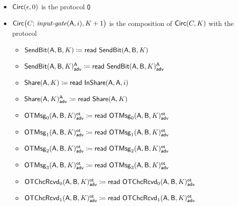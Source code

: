 \begin{itemize}
\item $\Circ(\epsilon,0)$ is the protocol $\zero$

\item $\Circ\big(C; \, \inputgate(\A,i),K+1\big)$ is the composition of $\Circ(C,K)$ with the protocol
\begin{itemize}
\item $\SendBit(\A,\B,K) \coloneqq \read{\SendBit(\A,\B,K)}$
\item {\color{blue} $\LeakSendBit(\A,\B,K)^\A_\adv \coloneqq \read{\LeakSendBit(\A,\B,K)^\A_\adv}$}\smallskip
\item $\Share(\A,K) \coloneqq \read{\InShare(\A,\A,i)}$
\item {\color{blue} $\LeakShare(\A,K)^\A_\adv \coloneqq \read{\Share(\A,K)}$}\smallskip
\item {\color{blue} $\LeakOTMsg_0(\A,\B,K)^\ot_\adv \coloneqq \read{\LeakOTMsg_0(\A,\B,K)^\ot_\adv}$}
\item {\color{blue} $\LeakOTMsg_1(\A,\B,K)^\ot_\adv \coloneqq \read{\LeakOTMsg_1(\A,\B,K)^\ot_\adv}$}
\item {\color{blue} $\LeakOTMsg_2(\A,\B,K)^\ot_\adv \coloneqq \read{\LeakOTMsg_2(\A,\B,K)^\ot_\adv}$}
\item {\color{blue} $\LeakOTMsg_3(\A,\B,K)^\ot_\adv \coloneqq \read{\LeakOTMsg_3(\A,\B,K)^\ot_\adv}$}\smallskip
\item {\color{blue} $\LeakOTChcRcvd_0(\A,\B,K)^\ot_\adv \coloneqq \read{\LeakOTChcRcvd_0(\A,\B,K)^\ot_\adv}$}
\item {\color{blue} $\LeakOTChcRcvd_1(\A,\B,K)^\ot_\adv \coloneqq \read{\LeakOTChcRcvd_1(\A,\B,K)^\ot_\adv}$}
\end{itemize}


\end{itemize}
